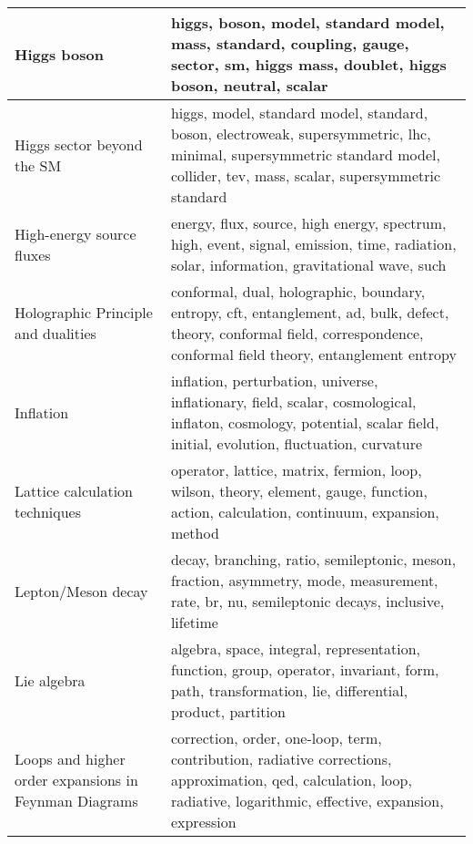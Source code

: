 \begin{longtable}[H]{p{}|p{}}
Higgs boson                                           &                                                                        higgs, boson, model, standard model, mass, standard, coupling, gauge, sector, sm, higgs mass, doublet, higgs boson, neutral, scalar \\ \midrule
Higgs sector beyond the SM                            &                              higgs, model, standard model, standard, boson, electroweak, supersymmetric, lhc, minimal, supersymmetric standard model, collider, tev, mass, scalar, supersymmetric standard \\ \midrule
High-energy source fluxes                             &                                                                  energy, flux, source, high energy, spectrum, high, event, signal, emission, time, radiation, solar, information, gravitational wave, such \\ \midrule
Holographic Principle and dualities                   &                                conformal, dual, holographic, boundary, entropy, cft, entanglement, ad, bulk, defect, theory, conformal field, correspondence, conformal field theory, entanglement entropy \\ \midrule
Inflation                                             &                                     inflation, perturbation, universe, inflationary, field, scalar, cosmological, inflaton, cosmology, potential, scalar field, initial, evolution, fluctuation, curvature \\ \midrule
Lattice calculation techniques                        &                                                                      operator, lattice, matrix, fermion, loop, wilson, theory, element, gauge, function, action, calculation, continuum, expansion, method \\ \midrule
Lepton/Meson decay                                    &                                                               decay, branching, ratio, semileptonic, meson, fraction, asymmetry, mode, measurement, rate, br, nu, semileptonic decays, inclusive, lifetime \\ \midrule
Lie algebra                                           &                                                          algebra, space, integral, representation, function, group, operator, invariant, form, path, transformation, lie, differential, product, partition \\ \midrule
Loops and higher order expansions in Feynman Diagrams &                                    correction, order, one-loop, term, contribution, radiative corrections, approximation, qed, calculation, loop, radiative, logarithmic, effective, expansion, expression \\ \midrule

\end{longtable}
